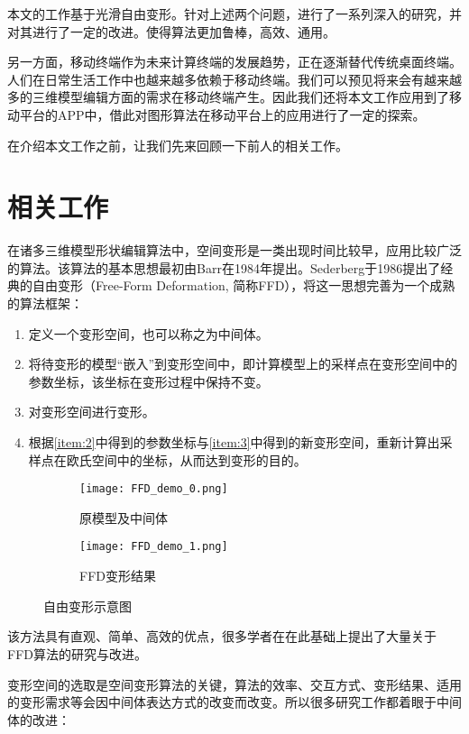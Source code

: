     本文的工作基于光滑自由变形\cite{Cui15}。针对上述两个问题，进行了一系列深入的研究，并对其进行了一定的改进。使得算法更加鲁棒，高效、通用。

    另一方面，移动终端作为未来计算终端的发展趋势，正在逐渐替代传统桌面终端。人们在日常生活工作中也越来越多依赖于移动终端。我们可以预见将来会有越来越多的三维模型编辑方面的需求在移动终端产生。因此我们还将本文工作应用到了移动平台的APP中，借此对图形算法在移动平台上的应用进行了一定的探索。

    在介绍本文工作之前，让我们先来回顾一下前人的相关工作。


\section{相关工作}
    在诸多三维模型形状编辑算法中，空间变形是一类出现时间比较早，应用比较广泛的算法。该算法的基本思想最初由Barr\cite{Barr84}在1984年提出。Sederberg\cite{Sederberg86}于1986提出了经典的自由变形（Free-Form Deformation, 简称FFD），将这一思想完善为一个成熟的算法框架：
\begin{enumerate}
	\item 定义一个变形空间，也可以称之为中间体。
    \item 将待变形的模型“嵌入”到变形空间中，即计算模型上的采样点在变形空间中的参数坐标，该坐标在变形过程中保持不变。\label{item:2}
	\item 对变形空间进行变形。\label{item:3}
    \item 根据\ref{item:2}中得到的参数坐标与\ref{item:3}中得到的新变形空间，重新计算出采样点在欧氏空间中的坐标，从而达到变形的目的。
\end{enumerate}

\begin{figure}[htbp]
	\centering
	\begin{subfigure}[b]{.4\textwidth}
		\centering
		\texttt{[image: FFD\_demo\_0.png]}
		\caption{原模型及中间体}\label{subfig:FFD_demo_0}
	\end{subfigure}
	\quad
	\begin{subfigure}[b]{.4\textwidth}
		\centering
		\texttt{[image: FFD\_demo\_1.png]}
		\caption{FFD变形结果}\label{subfig:FFD_demo_1}
	\end{subfigure}
    \caption{自由变形示意图}\label{fig:FFD_demo}
\end{figure}

    该方法具有直观、简单、高效的优点，很多学者在在此基础上提出了大量关于FFD算法的研究与改进。

    变形空间的选取是空间变形算法的关键，算法的效率、交互方式、变形结果、适用的变形需求等会因中间体表达方式的改变而改变。所以很多研究工作都着眼于中间体的改进：

